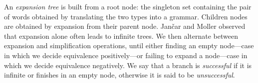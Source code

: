 An \emph{expansion tree} is built from a root node: the singleton set
containing the pair of words obtained by translating the two types
into a grammar. Children nodes are obtained by expansion from their
parent node. Jan{\v{c}}ar and Moller observed that expansion alone
often leads to infinite trees. We then alternate between expansion and
simplification operations, until either finding an empty node---case
in which we decide equivalence positively---or failing to expand a
node---case in which we decide equivalence negatively.
%
%
We say that a branch is \emph{successful} if it is infinite or
finishes in an empty node, otherwise it is said to be
\emph{unsuccessful}.

